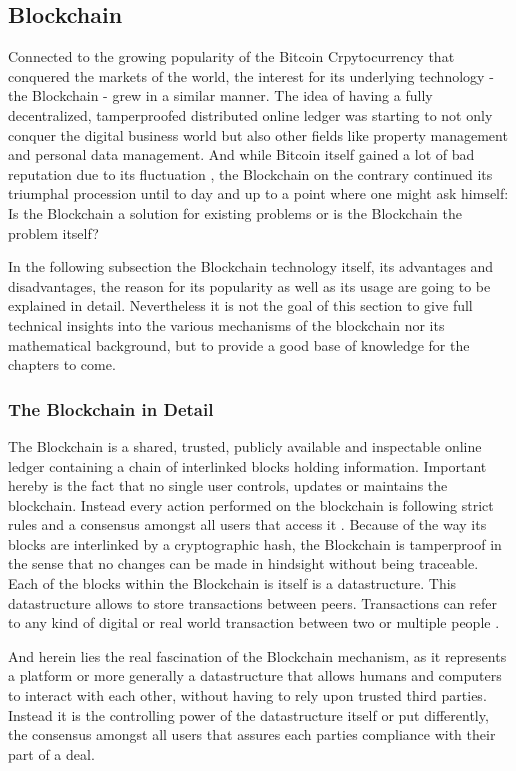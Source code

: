 \subsection{Blockchain}
\label{subsec:02_blockchain}

Connected to the growing popularity of the Bitcoin Crpytocurrency that conquered the markets of the world, the interest for its underlying technology - the Blockchain - grew in a similar manner. The idea of having a fully decentralized, tamperproofed distributed online ledger was starting to not only conquer the digital business world but also other fields like property management and personal data management. And while Bitcoin itself gained a lot of bad reputation due to its fluctuation \cite{Shackelford2016}, the Blockchain on the contrary continued its triumphal procession until to day and up to a point where one might ask himself: Is the Blockchain a solution for existing problems or is the Blockchain the problem itself? \cite{Stinchcombe2017} \cite{Nielsen2018}


In the following subsection the Blockchain technology itself, its advantages and disadvantages, the reason for its popularity as well as its usage are going to be explained in detail. Nevertheless it is not the goal of this section to give full technical insights into the various mechanisms of the blockchain nor its mathematical background, but to provide a good base of knowledge for the chapters to come.

\subsubsection{The Blockchain in Detail}
The Blockchain is a shared, trusted, publicly available and inspectable online ledger containing a chain of interlinked blocks holding information. Important hereby is the fact that no single user controls, updates or maintains the blockchain. Instead every action performed on the blockchain is following strict rules and a consensus amongst all users that access it \cite{Shackelford2016}. Because of the way its blocks are interlinked by a cryptographic hash, the Blockchain is tamperproof in the sense that no changes can be made in hindsight without being traceable. 
Each of the blocks within the Blockchain is itself is a datastructure.  This datastructure allows to store transactions between peers. Transactions can refer to any kind of digital or real world transaction between two or multiple people \cite{Wust2017}.

And herein lies the real fascination of the Blockchain mechanism, as it represents a platform or more generally a datastructure that allows humans and computers to interact with each other, without having to rely upon trusted third parties. Instead it is the controlling power of the datastructure itself or put differently, the consensus amongst all users that assures each parties compliance with their part of a deal.
